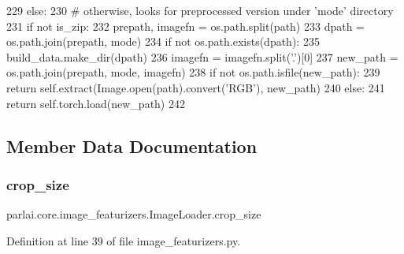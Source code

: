 \begin{DoxyCode}
229         \textcolor{keywordflow}{else}:
230             \textcolor{comment}{# otherwise, looks for preprocessed version under 'mode' directory}
231             \textcolor{keywordflow}{if} \textcolor{keywordflow}{not} is\_zip:
232                 prepath, imagefn = os.path.split(path)
233             dpath = os.path.join(prepath, mode)
234             \textcolor{keywordflow}{if} \textcolor{keywordflow}{not} os.path.exists(dpath):
235                 build\_data.make\_dir(dpath)
236             imagefn = imagefn.split(\textcolor{stringliteral}{'.'})[0]
237             new\_path = os.path.join(prepath, mode, imagefn)
238             \textcolor{keywordflow}{if} \textcolor{keywordflow}{not} os.path.isfile(new\_path):
239                 \textcolor{keywordflow}{return} self.extract(Image.open(path).convert(\textcolor{stringliteral}{'RGB'}), new\_path)
240             \textcolor{keywordflow}{else}:
241                 \textcolor{keywordflow}{return} self.torch.load(new\_path)
242 \end{DoxyCode}


\subsection{Member Data Documentation}
\mbox{\label{classparlai_1_1core_1_1image__featurizers_1_1ImageLoader_ac576a1193d349be494103b6ea25449b0}} 
\subsubsection{\texorpdfstring{crop\+\_\+size}{crop\_size}}
{\footnotesize\ttfamily parlai.\+core.\+image\+\_\+featurizers.\+Image\+Loader.\+crop\+\_\+size}



Definition at line 39 of file image\+\_\+featurizers.\+py.

\mbox{\label{classparlai_1_1core_1_1image__featurizers_1_1ImageLoader_a5a375010eb3a74e13b227d24ba1dbd71}} 

